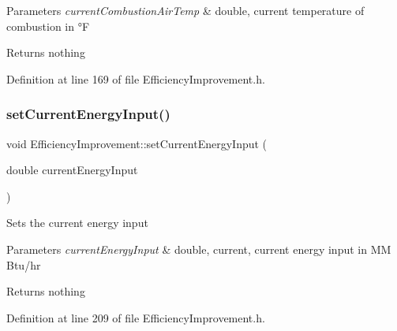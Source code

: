 \begin{DoxyParams}{Parameters}
{\em current\+Combustion\+Air\+Temp} & double, current temperature of combustion in °F\\
\hline
\end{DoxyParams}
\begin{DoxyReturn}{Returns}
nothing 
\end{DoxyReturn}


Definition at line 169 of file Efficiency\+Improvement.\+h.

\mbox{\label{class_efficiency_improvement_a72c247fcd3f7791566205ec783e13d81}} 
\subsubsection{\texorpdfstring{set\+Current\+Energy\+Input()}{setCurrentEnergyInput()}\hspace{0.1cm}{\footnotesize\ttfamily [1/3]}}
{\footnotesize\ttfamily void Efficiency\+Improvement\+::set\+Current\+Energy\+Input (\begin{DoxyParamCaption}\item[{double}]{current\+Energy\+Input }\end{DoxyParamCaption})\hspace{0.3cm}{\ttfamily [inline]}}

Sets the current energy input


\begin{DoxyParams}{Parameters}
{\em current\+Energy\+Input} & double, current, current energy input in MM Btu/hr\\
\hline
\end{DoxyParams}
\begin{DoxyReturn}{Returns}
nothing 
\end{DoxyReturn}


Definition at line 209 of file Efficiency\+Improvement.\+h.

\mbox{\label{class_efficiency_improvement_a72c247fcd3f7791566205ec783e13d81}} 
